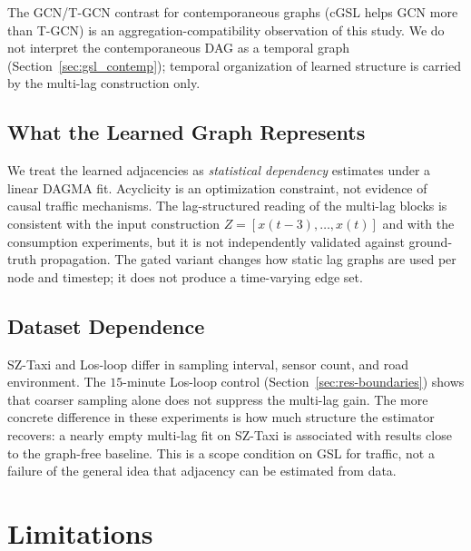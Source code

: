 The GCN/T-GCN contrast for contemporaneous graphs (cGSL helps GCN more than
T-GCN) is an aggregation-compatibility observation of this study. We do not
interpret the contemporaneous DAG as a temporal graph
(Section~\ref{sec:gsl_contemp}); temporal organization of learned structure
is carried by the multi-lag construction only.

\subsection{What the Learned Graph Represents}\label{sec:disc-interpretation}

We treat the learned adjacencies as \emph{statistical dependency}
estimates under a linear DAGMA fit. Acyclicity is an optimization
constraint, not evidence of causal traffic mechanisms. The lag-structured
reading of the multi-lag blocks is consistent with the input construction
$Z=[x(t-3),\ldots,x(t)]$ and with the consumption experiments, but it is
not independently validated against ground-truth propagation. The gated
variant changes how static lag graphs are used per node and timestep; it
does not produce a time-varying edge set.

\subsection{Dataset Dependence}\label{sec:disc-dataset}

SZ-Taxi and Los-loop differ in sampling interval, sensor count, and road
environment. The $15$-minute Los-loop control (Section~\ref{sec:res-boundaries})
shows that coarser sampling alone does not suppress the multi-lag gain.
The more concrete difference in these experiments is how much structure the
estimator recovers: a nearly empty multi-lag fit on SZ-Taxi is associated
with results close to the graph-free baseline. This is a scope condition on
GSL for traffic, not a failure of the general idea that adjacency can be
estimated from data.

\section{Limitations}\label{sec:limitations}

